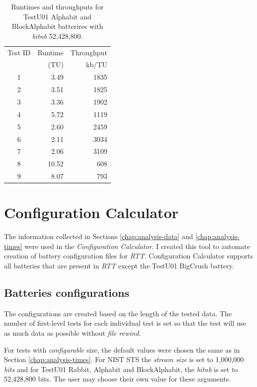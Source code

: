 \documentclass[
  digital,     %
  oneside,     %
  nosansbold,  %
  nocolorbold, %
  nolof,         %
  nolot,         %
]{fithesis4}
\begin{document}
\begin{table}[H]
  \begin{tabularx}{0.5\textwidth}{c|r|r}
  Test ID & Runtime & Throughput \\
         & (TU) &  kb/TU\\
  \midrule
        1 & 3.49 & 1835 \\
        2 & 3.51 & 1825 \\
        3 & 3.36 & 1902 \\
        4 & 5.72 & 1119 \\
        5 & 2.60 & 2459 \\
        6 & 2.11 & 3034 \\
        7 & 2.06 & 3109 \\
        8 & 10.52 & 608 \\
        9 & 8.07 & 793 \\
  \end{tabularx}
  \caption{Runtimes and throughputs for TestU01 Alphabit and BlockAlphabit batterires with \emph{bit\textunderscore nb} 52,428,800.}
  \label{tab:analysis_alphabit_time}
\end{table}


\section{Configuration Calculator}

The information collected in Sections \ref{chap:analysis-data} and \ref{chap:analysis-times} were used in the \emph{Configuration Calculator}. I created this tool to automate creation of battery configuration files for \emph{RTT}. Configuration Calculator supports all batteries that are present in \emph{RTT} except the TestU01 BigCrush battery.

\subsection{Batteries configurations}

The configurations are created based on the length of the tested data. The number of first-level tests for each individual test is set so that the test will use as much data as possible without \emph{file rewind}.

For tests with \emph{configurable} size, the default values were chosen the same as in Section \ref{chap:analysis-times}. For NIST STS the \emph{stream size} is set to 1,000,000 \emph{bits} and for TestU01 Rabbit, Alphabit and BlockAlphabit, the \emph{bit\textunderscore nb} is set to  52,428,800 bits. The user may choose their own value for these arguments.
\end{document}
